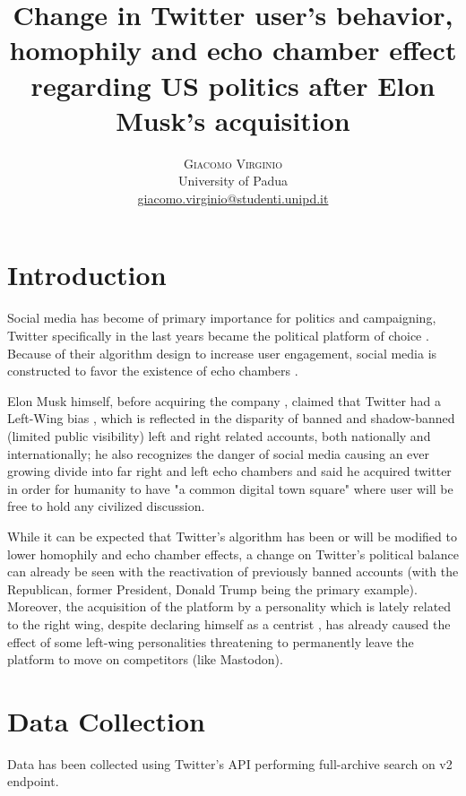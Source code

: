 \documentclass[twoside,twocolumn]{article}
\title{Change in Twitter user's behavior, homophily and echo chamber effect regarding US politics after Elon Musk's acquisition} %
\author{%
	\textsc{Giacomo Virginio}\\[1ex] %
	\normalsize University of Padua \\ %
	\normalsize \href{mailto:giacomo.virginio@studenti.unipd.it}{giacomo.virginio@studenti.unipd.it} %
}
\date{} %
\begin{document}
	
	\maketitle
	
	
	\section{Introduction}
	Social media has become of primary importance for politics and campaigning, Twitter specifically in the last years became the political platform of choice \cite{Statista:2022}.
	Because of their algorithm design to increase user engagement, social media is constructed to favor the existence of echo chambers \cite{Cinelli:2021}.
	
	Elon Musk himself, before acquiring the company \cite{TwitterAcquisition}, claimed that Twitter had a Left-Wing bias \cite{MuskBias}, which is reflected in the disparity of banned and shadow-banned (limited public visibility) left and right related accounts, both nationally and internationally; he also recognizes the danger of social media causing an ever growing divide into far right and left echo chambers and said he acquired twitter in order for humanity to have "a common digital town square" \cite{MuskEcho} where user will be free to hold any civilized discussion.
	
	While it can be expected that Twitter's algorithm has been or will be modified to lower homophily and echo chamber effects, a change on Twitter's political balance can already be seen with the reactivation of previously banned accounts (with the Republican, former President, Donald Trump being the primary example). Moreover, the acquisition of the platform by a personality which is lately related to the right wing, despite declaring himself as a centrist \cite{MuskCenter}, has already caused the effect of some left-wing personalities threatening to permanently leave the platform to move on competitors (like Mastodon).
	
	
	\section{Data Collection}
	Data has been collected using Twitter's API performing full-archive search on v2 endpoint.
	
\end{document}
